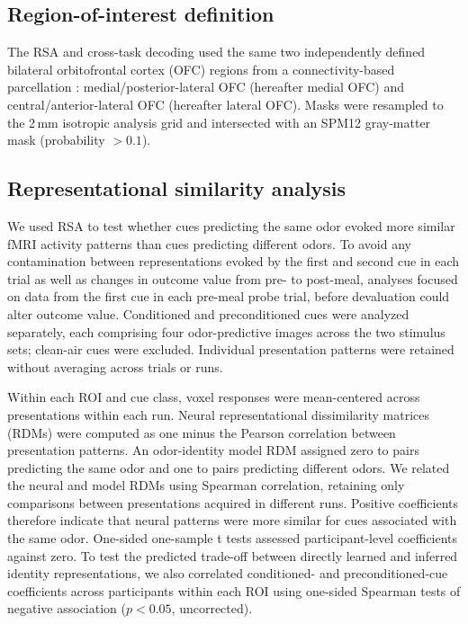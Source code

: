 \documentclass[9pt,twocolumn,twoside]{pnas-new}
\begin{document}
{\subsection*{Region-of-interest definition}

The RSA and cross-task decoding used the same two independently defined bilateral orbitofrontal cortex (OFC) regions from a connectivity-based parcellation \cite{kahnt2012connectivity}: medial/posterior-lateral OFC (hereafter medial OFC) and central/anterior-lateral OFC (hereafter lateral OFC). Masks were resampled to the 2\,mm isotropic analysis grid and intersected with an SPM12 gray-matter mask (probability $>0.1$).

\subsection*{Representational similarity analysis}
\label{rsa-probe}

We used RSA to test whether cues predicting the same odor evoked more similar fMRI activity patterns than cues predicting different odors. To avoid any contamination between representations evoked by the first and second cue in each trial as well as changes in outcome value from pre- to post-meal, analyses focused on data from the first cue in each pre-meal probe trial, before devaluation could alter outcome value. Conditioned and preconditioned cues were analyzed separately, each comprising four odor-predictive images across the two stimulus sets; clean-air cues were excluded. Individual presentation patterns were retained without averaging across trials or runs.

Within each ROI and cue class, voxel responses were mean-centered across presentations within each run. Neural representational dissimilarity matrices (RDMs) were computed as one minus the Pearson correlation between presentation patterns. An odor-identity model RDM assigned zero to pairs predicting the same odor and one to pairs predicting different odors. We related the neural and model RDMs using Spearman correlation, retaining only comparisons between presentations acquired in different runs. Positive coefficients therefore indicate that neural patterns were more similar for cues associated with the same odor. One-sided one-sample t tests assessed participant-level coefficients against zero. To test the predicted trade-off between directly learned and inferred identity representations, we also correlated conditioned- and preconditioned-cue coefficients across participants within each ROI using one-sided Spearman tests of negative association ($p < 0.05$, uncorrected).

}
\end{document}
